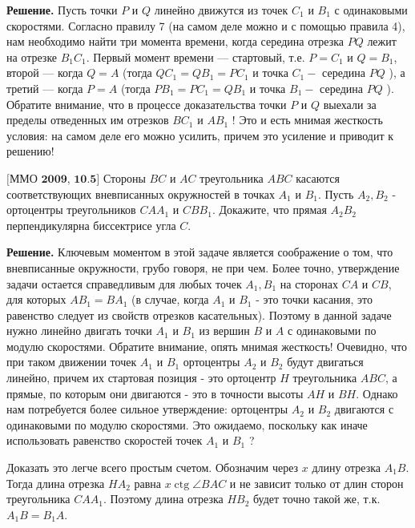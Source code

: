 \textbf{Решение.} Пусть точки $P$ и $Q$ линейно движутся из точек $C_1$ и $B_1$ с одинаковыми скоростями. Согласно правилу 7 (на самом деле можно и с помощью правила 4), нам необходимо найти три момента времени, когда середина отрезка $P Q$ лежит на отрезке $B_1 C_1$. Первый момент времени --- стартовый, т.е. $P=C_1$ и $Q=B_1$, второй --- когда $Q=A$ (тогда $Q C_1=Q B_1=P C_1$ и точка $C_1-$ середина $P Q$ ), а третий --- когда $P=A$ (тогда $P B_1=P C_1=Q B_1$ и точка $B_1-$ середина $P Q$ ). Обратите внимание, что в процессе доказательства точки $P$ и $Q$ выехали за пределы отведенных им отрезков $B C_1$ и $A B_1$ ! Это и есть мнимая жесткость условия: на самом деле его можно усилить, причем это усиление и приводит к решению!

$\bigl[\textbf{ММО 2009, 10.5}\bigr]$
Стороны $B C$ и $A C$ треугольника $A B C$ касаются соответствующих вневписанных окружностей в точках $A_1$ и $B_1$. Пусть $A_2, B_2$ - ортоцентры треугольников $C A A_1$ и $C B B_1$. Докажите, что прямая $A_2 B_2$ перпендикулярна биссектрисе угла $C$.

\textbf{Решение.}
Ключевым моментом в этой задаче является соображение о том, что вневписанные окружности, грубо говоря, не при чем. Более точно, утверждение задачи остается справедливым для любых точек $A_1, B_1$ на сторонах $C A$ и $C B$, для которых $A B_1=B A_1$ (в случае, когда $A_1$ и $B_1$ - это точки касания, это равенство следует из свойств отрезков касательных). Поэтому в данной задаче нужно линейно двигать точки $A_1$ и $B_1$ из вершин $B$ и $A$ с одинаковыми по модулю скоростями. Обратите внимание, опять мнимая жесткость! Очевидно, что при таком движении точек $A_1$ и $B_1$ ортоцентры $A_2$ и $B_2$ будут двигаться линейно, причем их стартовая позиция - это ортоцентр $H$ треугольника $A B C$, а прямые, по которым они двигаются - это в точности высоты $A H$ и $B H$. Однако нам потребуется более сильное утверждение: ортоцентры $A_2$ и $B_2$ двигаются с одинаковыми по модулю скоростями. Это ожидаемо, поскольку как иначе использовать равенство скоростей точек $A_1$ и $B_1$ ?

\newpage

\hspace{3mm}

Доказать это легче всего простым счетом. Обозначим через $x$ длину отрезка $A_1 B$. Тогда длина отрезка $H A_2$ равна $x \operatorname{ctg} \angle B A C$ и не зависит только от длин сторон треугольника $C A A_1$. Поэтому длина отрезка $H B_2$ будет точно такой же, т.к. $A_1 B=B_1 A$.

